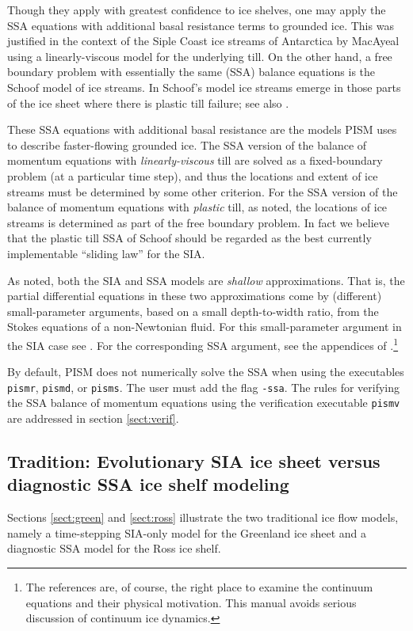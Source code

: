 \documentclass[11pt,final]{amsart}
\begin{document}
Though they apply with greatest confidence to ice shelves, one may apply the SSA equations with additional basal resistance terms to grounded ice.  This was justified in the context of the Siple Coast ice streams of Antarctica by MacAyeal \cite{MacAyeal,HulbeMacAyeal} using a linearly-viscous model for the underlying till.  On the other hand, a free boundary problem with essentially the same (SSA) balance equations is the Schoof \cite{SchoofStream} model of ice streams.  In Schoof's model ice streams emerge in those parts of the ice sheet where there is plastic till failure; see also \cite{SchoofTill}.

These SSA equations with additional basal resistance are the models PISM uses to describe faster-flowing grounded ice.  The SSA version of the balance of momentum equations with \emph{linearly-viscous} till are solved as a fixed-boundary problem (at a particular time step), and thus the locations and extent of ice streams must be determined by some other criterion.  For the SSA version of the balance of momentum equations with \emph{plastic} till, as noted, the locations of ice streams is determined as part of the free boundary problem.  In fact we believe that the plastic till SSA of Schoof should be regarded as the best currently implementable ``sliding law'' for the SIA.

As noted, both the SIA and SSA models are \emph{shallow} approximations.  That is, the partial differential equations in these two approximations come by (different) small-parameter arguments, based on a small depth-to-width ratio, from the Stokes equations of a non-Newtonian fluid.  For this small-parameter argument in the SIA case see \cite{Fowler}.  For the corresponding SSA argument, see the appendices of \cite{SchoofStream}.\footnote{The references are, of course, the right place to examine the continuum equations and their physical motivation.  This manual avoids serious discussion of continuum ice dynamics.}

By default, PISM does not numerically solve the SSA when using the executables \verb|pismr|, \verb|pismd|, or \verb|pisms|.  The user must add the flag \verb|-ssa|.  The rules for verifying the SSA balance of momentum equations using the verification executable \verb|pismv| are addressed in section \ref{sect:verif}.


\subsection{Tradition: Evolutionary SIA ice sheet versus diagnostic SSA ice shelf modeling} \label{subsect:basicmodes}  Sections \ref{sect:green} and \ref{sect:ross} illustrate the two traditional ice flow models, namely a time-stepping SIA-only model for the Greenland ice sheet and a diagnostic SSA model for the Ross ice shelf.
\end{document}
